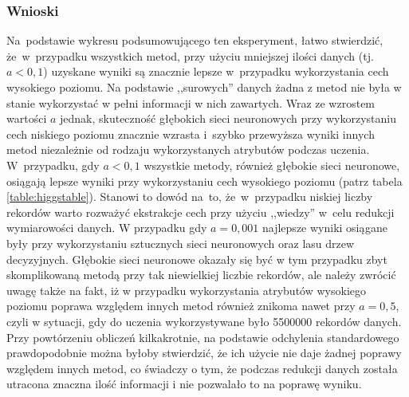 \subsubsection{Wnioski}
Na~podstawie wykresu podsumowującego ten eksperyment, łatwo stwierdzić, że~w~przypadku wszystkich metod, przy użyciu mniejszej ilości danych (tj. $a<0,1$) uzyskane wyniki są znacznie lepsze w~przypadku wykorzystania cech wysokiego poziomu. Na podstawie ,,surowych'' danych żadna z metod nie była w stanie wykorzystać w pełni informacji w nich zawartych. Wraz ze wzrostem wartości $a$ jednak, skuteczność głębokich sieci neuronowych przy wykorzystaniu cech niskiego poziomu znacznie wzrasta i~szybko przewyższa wyniki innych metod niezależnie od rodzaju wykorzystanych atrybutów podczas uczenia.
W~przypadku, gdy $a<0,1$ wszystkie metody, również głębokie sieci neuronowe, osiągają lepsze wyniki przy wykorzystaniu cech wysokiego poziomu (patrz tabela \ref{table:higgstable}). Stanowi to dowód na~to, że~w~przypadku niskiej liczby rekordów warto rozważyć ekstrakcje cech przy użyciu ,,wiedzy'' w~celu redukcji wymiarowości danych. W przypadku gdy $a=0,001$ najlepsze wyniki osiągane były przy wykorzystaniu sztucznych sieci neuronowych oraz lasu drzew decyzyjnych. Głębokie sieci neuronowe okazały się być w tym przypadku zbyt skomplikowaną metodą przy tak niewielkiej liczbie rekordów, ale należy zwrócić uwagę także na fakt, iż w przypadku wykorzystania atrybutów wysokiego poziomu poprawa względem innych metod również znikoma nawet przy $a=0,5$, czyli w sytuacji, gdy do uczenia wykorzystywane było 5500000 rekordów danych. Przy powtórzeniu obliczeń kilkakrotnie, na podstawie odchylenia standardowego prawdopodobnie można byłoby stwierdzić, że ich użycie nie daje żadnej poprawy względem innych metod, co świadczy o tym, że podczas redukcji danych została utracona znaczna ilość informacji i nie pozwalało to na poprawę wyniku.

